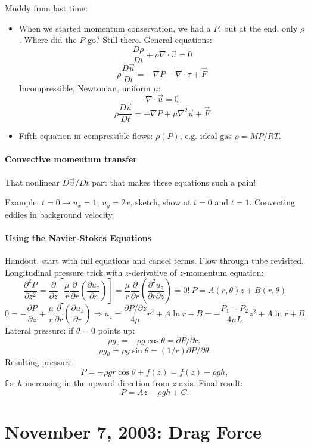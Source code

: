 \documentclass{report}
\begin{document}
\noindent Muddy from last time:
\begin{itemize}
\item When we started momentum conservation, we had a $P$, but at the end, only
  $\rho$.  Where did the $P$ go?  Still there.  General equations:
  $$\frac{D\rho}{Dt} + \rho\nabla\cdot\vec{u} = 0$$
  $$\rho\frac{D\vec{u}}{Dt} = -\nabla P - \nabla\cdot\tau + \vec{F}$$
  Incompressible, Newtonian, uniform $\mu$:
  $$\nabla\cdot\vec{u} = 0$$
  $$\rho\frac{D\vec{u}}{Dt} = -\nabla P + \mu\nabla^2\vec{u} + \vec{F}$$
\item Fifth equation in compressible flows: $\rho(P)$, e.g. ideal gas $\rho =
  MP/RT$.
\end{itemize}

\paragraph{Convective momentum transfer} That nonlinear $D\vec{u}/Dt$ part that
makes these equations such a pain!

Example: $t=0\rightarrow u_x=1$, $u_y=2x$, sketch, show at $t=0$ and $t=1$.
Convecting eddies in background velocity.

\paragraph{Using the Navier-Stokes Equations}

Handout, start with full equations and cancel terms.  Flow through tube
revisited.  Longitudinal pressure trick with $z$-derivative of $z$-momentum
equation:
$$\frac{\partial^2P}{\partial z^2} = \frac{\partial}{\partial z}
\left[\frac{\mu}{r}\frac{\partial}{\partial r}
  \left(\frac{\partial u_z}{\partial r}\right)\right] =
\frac{\mu}{r}\frac{\partial}{\partial r}
\left(\frac{\partial^2 u_z}{\partial r\partial z}\right) = 0!\ P=
A(r,\theta)z + B(r,\theta)$$
$$0 = -\frac{\partial P}{\partial z} + \frac{\mu}{r}\frac{\partial}{\partial r}
\left(\frac{\partial u_z}{\partial r}\right) \Rightarrow
u_z = \frac{\partial P/\partial z}{4\mu}r^2 + A\ln r + B =
-\frac{P_1-P_2}{4\mu L}z^2 + A\ln r + B.$$
Lateral pressure: if $\theta=0$ points up:
$$\rho g_r=-\rho g\cos\theta=\partial P/\partial r,$$
$$\rho g_\theta=\rho g\sin\theta = (1/r)\partial P/\partial\theta.$$
Resulting pressure:
$$P = - \rho gr\cos\theta + f(z) = f(z) - \rho gh,$$
for $h$ increasing in the upward direction from $z$-axis.  Final result:
$$P = Az - \rho gh + C.$$
\newpage


\section{November 7, 2003: Drag Force}
\end{document}
